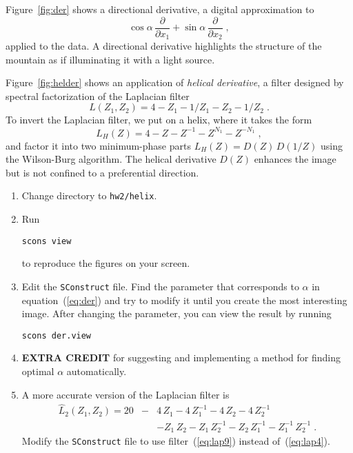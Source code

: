 Figure~\ref{fig:der} shows a directional derivative, a digital approximation to
\begin{equation}
\label{eq:der}
\cos{\alpha}\,\frac{\partial}{\partial x_1} + \sin{\alpha}\,\frac{\partial}{\partial x_2}\;,
\end{equation}
applied to the data. A directional derivative highlights the structure
of the mountain as if illuminating it with a light source.


Figure~\ref{fig:helder} shows an application of \emph{helical
derivative}, a filter designed by spectral factorization of the
Laplacian filter
\begin{equation}
\label{eq:lap4}
L(Z_1,Z_2) = 4 - Z_1 - 1/Z_1 - Z_2 - 1/Z_2\;.
\end{equation}
To invert the Laplacian filter, we put on a helix, where it takes
the form
\begin{equation}
\label{eq:lap1}
L_H(Z) = 4 - Z - Z^{-1} - Z^{N_1} - Z^{-N_1}\;,
\end{equation} 
and factor it into two minimum-phase parts $L_H(Z) = D(Z)\,D(1/Z)$
using the Wilson-Burg algorithm. The helical derivative $D(Z)$
enhances the image but is not confined to a preferential direction.


\begin{enumerate}
\item Change directory to \texttt{hw2/helix}.
\item Run 
\begin{verbatim}
scons view
\end{verbatim}
to reproduce the figures on your screen.
\item Edit the \texttt{SConstruct} file. Find the parameter that corresponds to $\alpha$ in equation~(\ref{eq:der}) and try to modify it until you create the most interesting image. After changing the parameter, you can view the result by running
\begin{verbatim}
scons der.view
\end{verbatim}
\item \textbf{EXTRA CREDIT} for suggesting and implementing a method for finding optimal $\alpha$ automatically.
\item A more accurate version of the Laplacian filter is
\begin{eqnarray}
\nonumber
\hat{L}_2(Z_1,Z_2) = 20 & - & 4\,Z_1 - 4\,Z_1^{-1} - 4\,Z_2 - 4\,Z_2^{-1} \\
&  & - Z_1\,Z_2 - Z_1\,Z_2^{-1} - Z_2\,Z_1^{-1} - Z_1^{-1}\,Z_2^{-1}\;.
\label{eq:lap9}
\end{eqnarray}
Modify the \texttt{SConstruct} file to use filter~(\ref{eq:lap9}) instead of~(\ref{eq:lap4}).
\end{enumerate}

